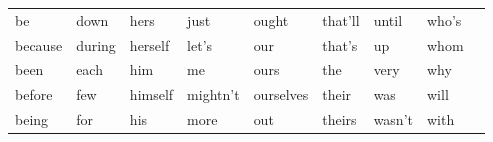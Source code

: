 \documentclass[12pt,onecolumn]{IEEEtran}
\begin{document}
\begin{tabular}{|lllllllll|}
		be      & down     & hers    & just     & ought     & that'll   & until      & who's   &            \\
		because & during   & herself & let's    & our       & that's    & up         & whom    &            \\
		been    & each     & him     & me       & ours      & the       & very       & why     &            \\
		before  & few      & himself & mightn't & ourselves & their     & was        & will    &            \\
		being   & for      & his     & more     & out       & theirs    & wasn't     & with    &            \\ \hline
	\end{tabular} 
	
	
\end{document}
